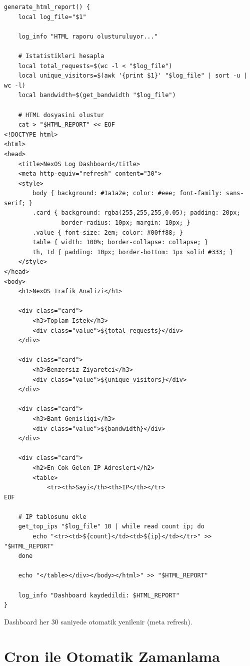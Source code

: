 \documentclass[12pt,a4paper]{report}
\begin{document}
\begin{lstlisting}[style=bashstyle,caption={HTML Dashboard Uretimi}]
generate_html_report() {
    local log_file="$1"
    
    log_info "HTML raporu olusturuluyor..."
    
    # Istatistikleri hesapla
    local total_requests=$(wc -l < "$log_file")
    local unique_visitors=$(awk '{print $1}' "$log_file" | sort -u | wc -l)
    local bandwidth=$(get_bandwidth "$log_file")
    
    # HTML dosyasini olustur
    cat > "$HTML_REPORT" << EOF
<!DOCTYPE html>
<html>
<head>
    <title>NexOS Log Dashboard</title>
    <meta http-equiv="refresh" content="30">
    <style>
        body { background: #1a1a2e; color: #eee; font-family: sans-serif; }
        .card { background: rgba(255,255,255,0.05); padding: 20px; 
                border-radius: 10px; margin: 10px; }
        .value { font-size: 2em; color: #00ff88; }
        table { width: 100%; border-collapse: collapse; }
        th, td { padding: 10px; border-bottom: 1px solid #333; }
    </style>
</head>
<body>
    <h1>NexOS Trafik Analizi</h1>
    
    <div class="card">
        <h3>Toplam Istek</h3>
        <div class="value">${total_requests}</div>
    </div>
    
    <div class="card">
        <h3>Benzersiz Ziyaretci</h3>
        <div class="value">${unique_visitors}</div>
    </div>
    
    <div class="card">
        <h3>Bant Genisligi</h3>
        <div class="value">${bandwidth}</div>
    </div>
    
    <div class="card">
        <h2>En Cok Gelen IP Adresleri</h2>
        <table>
            <tr><th>Sayi</th><th>IP</th></tr>
EOF
    
    # IP tablosunu ekle
    get_top_ips "$log_file" 10 | while read count ip; do
        echo "<tr><td>${count}</td><td>${ip}</td></tr>" >> "$HTML_REPORT"
    done
    
    echo "</table></div></body></html>" >> "$HTML_REPORT"
    
    log_info "Dashboard kaydedildi: $HTML_REPORT"
}
\end{lstlisting}

Dashboard her 30 saniyede otomatik yenilenir (meta refresh).

\section{Cron ile Otomatik Zamanlama}
\end{document}
